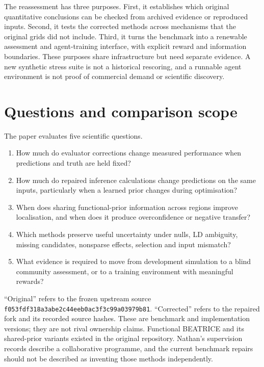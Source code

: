 \documentclass[
  british,
  10pt,
]{article}
\providecommand{\tightlist}{%
  \setlength{\itemsep}{0pt}\setlength{\parskip}{0pt}}
\begin{document}
The reassessment has three purposes. First, it establishes which
original quantitative conclusions can be checked from archived evidence
or reproduced inputs. Second, it tests the corrected methods across
mechanisms that the original grids did not include. Third, it turns the
benchmark into a renewable assessment and agent-training interface, with
explicit reward and information boundaries. These purposes share
infrastructure but need separate evidence. A new synthetic stress suite
is not a historical rescoring, and a runnable agent environment is not
proof of commercial demand or scientific discovery.

\section{Questions and comparison
scope}\label{questions-and-comparison-scope}

The paper evaluates five scientific questions.

\begin{enumerate}
\def\labelenumi{\arabic{enumi}.}
\tightlist
\item
  How much do evaluator corrections change measured performance when
  predictions and truth are held fixed?
\item
  How much do repaired inference calculations change predictions on the
  same inputs, particularly when a learned prior changes during
  optimisation?
\item
  When does sharing functional-prior information across regions improve
  localisation, and when does it produce overconfidence or negative
  transfer?
\item
  Which methods preserve useful uncertainty under nulls, LD ambiguity,
  missing candidates, nonsparse effects, selection and input mismatch?
\item
  What evidence is required to move from development simulation to a
  blind community assessment, or to a training environment with
  meaningful rewards?
\end{enumerate}

``Original'' refers to the frozen upstream source
\texttt{f053fdf318a3abe2c44eeb0ac3f3c99a03979b81}. ``Corrected'' refers
to the repaired fork and its recorded source hashes. These are benchmark
and implementation versions; they are not rival ownership claims.
Functional BEATRICE and its shared-prior variants existed in the
original repository. Nathan's supervision records describe a
collaborative programme, and the current benchmark repairs should not be
described as inventing those methods independently.
\end{document}
